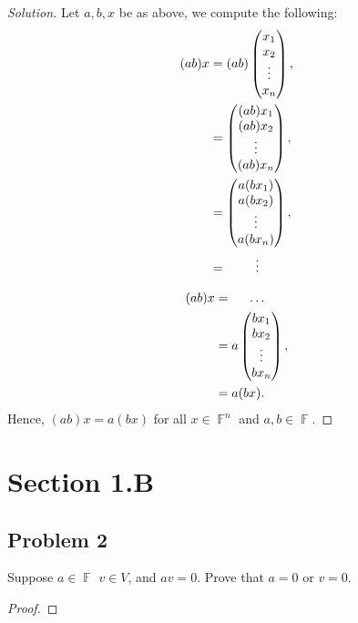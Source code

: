 \documentclass[letterpaper, 12pt]{amsart}
\DeclareMathOperator{\F}{\mathbb{F}}
\theoremstyle{definition}  %
\begin{document}
		\begin{proof}[Solution]
		Let $a,b,x$ be as above, we compute the following:
		\begin{align*}
		(ab)x &= (ab) \begin{pmatrix} x_{1} \\ x_{2} \\ \vdots \\ x_{n} \end{pmatrix}, \\
		&= \begin{pmatrix} (ab)x_{1} \\ (ab)x_{2} \\ \vdots \\ (ab)x_{n} \end{pmatrix}, \\
		&= \begin{pmatrix} a(bx_{1}) \\ a(bx_{2}) \\ \vdots \\ a(bx_{n}) \end{pmatrix}, \\
		&= \hspace{8mm} \vdots
		\end{align*}
		\pagebreak
		
		\begin{align*}
		(ab)x &= \hspace{5mm} \dots \\
		&= a\begin{pmatrix} bx_{1} \\ bx_{2} \\ \vdots \\ bx_{n} \end{pmatrix}, \\
		&= a (bx).
		\end{align*}
		Hence, $(ab)x = a(bx)$ for all $x \in \F^{n}$ and $a,b \in \F$.
		\end{proof}

	\section*{Section 1.B}
		\subsection*{Problem 2}
		Suppose $a \in \F$ $v \in V$, and $av = 0$.
		Prove that $a = 0$ or $v = 0$.

		\begin{proof}
		\end{proof}
\end{document}
